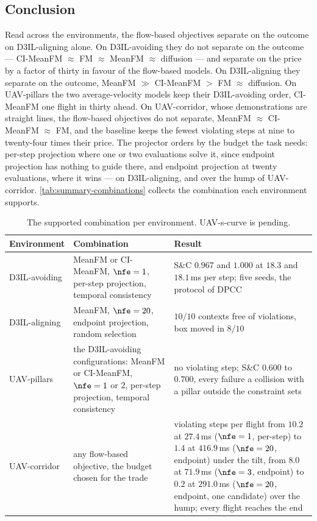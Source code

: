 \subsection{Conclusion}\label{sec:res:summary:conclusion}

Read across the environments, the flow-based objectives separate on the outcome on D3IL-aligning alone. On
D3IL-avoiding they do not separate on the outcome --- CI-MeanFM $\approx$ FM $\approx$ MeanFM $\approx$
diffusion --- and separate on the price by a factor of thirty in favour of the flow-based models. On
D3IL-aligning they separate on the outcome, MeanFM $\gg$ CI-MeanFM $>$ FM $\approx$ diffusion. On UAV-pillars
the two average-velocity models keep their D3IL-avoiding order, CI-MeanFM one flight in thirty ahead. On
UAV-corridor, whose demonstrations are straight lines, the flow-based objectives do not separate, MeanFM
$\approx$ CI-MeanFM $\approx$ FM, and the baseline keeps the fewest violating steps at nine to twenty-four
times their price. The projector orders by the budget the task needs: per-step projection where one or two
evaluations solve it, since endpoint projection has nothing to guide there, and endpoint projection at twenty
evaluations, where it wins --- on D3IL-aligning, and over the hump of UAV-corridor.
\autoref{tab:summary-combinations} collects the combination each environment supports.

\begin{table}[htpb]
  \caption[Selected model--projection combinations]{The supported combination per environment. UAV-s-curve
  is pending.}
  \label{tab:summary-combinations}
  \centering
  \small
  \begin{tabularx}{\linewidth}{@{}p{2.2cm} L L@{}}
    \toprule
    Environment & Combination & Result \\
    \midrule
    D3IL-avoiding
      & MeanFM or CI-MeanFM, $\nfe=1$, per-step projection, temporal consistency
      & S\&C $0.967$ and $1.000$ at $18.3$ and $18.1$\,ms per step; five seeds, the protocol of \ac{DPCC} \\
    D3IL-aligning
      & MeanFM, $\nfe=20$, endpoint projection, random selection
      & $10/10$ contexts free of violations, box moved in $8/10$ \\
    UAV-pillars
      & the D3IL-avoiding configurations: MeanFM or CI-MeanFM, $\nfe=1$ or $2$, per-step projection, temporal
        consistency
      & no violating step; S\&C $0.600$ to $0.700$, every failure a collision with a pillar outside the
        constraint sets \\
    UAV-corridor
      & any flow-based objective, the budget chosen for the trade
      & violating steps per flight from $10.2$ at $27.4$\,ms ($\nfe=1$, per-step) to $1.4$ at $416.9$\,ms
        ($\nfe=20$, endpoint) under the tilt, from $8.0$ at $71.9$\,ms ($\nfe=3$, endpoint) to $0.2$ at
        $291.0$\,ms ($\nfe=20$, endpoint, one candidate) over the hump; every flight reaches the end \\
    \bottomrule
  \end{tabularx}
\end{table}

